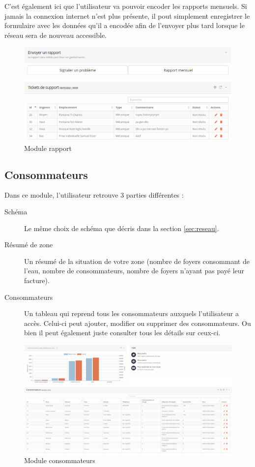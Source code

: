 \documentclass{EPL-master-thesis-covers-FR}
\begin{document}
				C'est également ici que l'utilisateur va pouvoir encoder les rapports mensuels. Si jamais la connexion internet n'est plus présente, il pout simplement enregistrer le formulaire avec les données qu'il a encodée afin de l'envoyer plus tard lorsque le réseau sera de nouveau accessible.
				
				\begin{figure}[H]
					\centering
					\includegraphics[width=1\textwidth]{images/report}
					\caption{Module rapport}
				\end{figure}
			
			\subsection{Consommateurs}
				Dans ce module, l'utilisateur retrouve 3 parties différentes :
				\begin{description}
					\item[Schéma] Le même choix de schéma que décris dans la section \ref{sec:reseau}.
					\item[Résumé de zone] Un résumé de la situation de votre zone (nombre de foyers consommant de l'eau, nombre de consommateurs, nombre de foyers n'ayant pas payé leur facture).
					\item[Consommateurs] Un tableau qui reprend tous les consommateurs auxquels l'utilisateur a accès. Celui-ci peut ajouter, modifier ou supprimer des consommateurs. Ou bien il peut également juste consulter tous les détails sur ceux-ci.
				\end{description}

				
				\begin{figure}[H]
					\centering
					\includegraphics[width=1\textwidth]{images/consumer}
					\caption{Module consommateurs}
				\end{figure}
				
\end{document}
